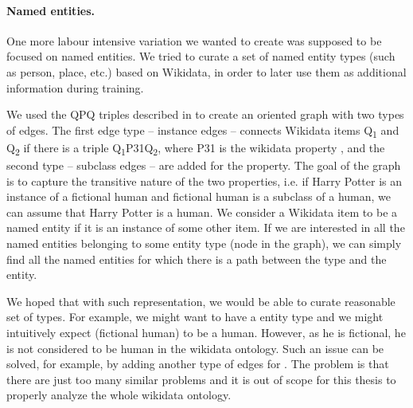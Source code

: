 \paragraph{Named entities.}

One more labour intensive variation we wanted to create was supposed to be focused on named entities. We tried to curate a set of named entity types (such as person, place, etc.) based on Wikidata, in order to later use them as additional information during training. 

We used the QPQ triples described in  to create an oriented graph with two types of edges. The first edge type -- instance edges -- connects Wikidata items Q\textsubscript{1} and Q\textsubscript{2} if there is a triple Q\textsubscript{1}P31Q\textsubscript{2}, where P31 is the wikidata property , and the second type -- subclass edges -- are added for the  property. The goal of the graph is to capture the transitive nature of the two properties, i.e. if Harry Potter is an instance of a fictional human and fictional human is a subclass of a human, we can assume that Harry Potter is a human. We consider a Wikidata item to be a named entity if it is an instance of some other item. If we are interested in all the named entities belonging to some entity type (node in the graph), we can simply find all the named entities for which there is a path between the type and the entity.

We hoped that with such representation, we would be able to curate reasonable set of types. For example, we might want to have a  entity type and we might intuitively expect  (fictional human) to be a human. However, as he is fictional, he is not considered to be human in the wikidata ontology. Such an issue can be solved, for example, by adding another type of edges for . The problem is that there are just too many similar problems and it is out of scope for this thesis to properly analyze the whole wikidata ontology. 



